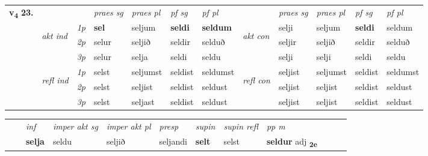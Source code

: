 \begin{tabular}{llllllllllll} \toprule
\multirow{4}{*}{{{\textbf{v{\textsubscript{4}}} \Large{\textbf{23.}}}}}  & &   &  \textit{praes sg}  & \textit{praes pl}  &\textit{ pf sg} & \textit{pf pl} &  &  \textit{praes sg}  & \textit{praes pl}  & \textit{pf sg} & \textit{pf pl } \\*
	\cmidrule{4-7} \cmidrule{9-12}
 & \multirow{3}{*}{\begin{turn}{90}\textit{akt ind}\end{turn}} & {\textit{1p}} & \textbf{sel} & seljum    & \textbf{seldi} & \textbf{seldum} & \multirow{3}{*}{\begin{turn}{90}\textit{akt con}\end{turn}} &selji & seljum & \textbf{seldi} & seldum\\*
& &  {\textit{2p}} &  selur  & seljið   & seldir & selduð & & seljir & seljið & seldir & selduð \\*
& &  {\textit{3p}} & selur & selja   & seldi & seldu & & selji & selji& seldi & seldu  \\*
\cmidrule{4-7} \cmidrule{9-12}
 &\multirow{3}{*}{\begin{turn}{90}\textit{refl ind}\end{turn}} & {\textit{1p}} & selst & seljumst    & seldist & seldumst & \multirow{3}{*}{\begin{turn}{90}\textit{refl con}\end{turn}}  &seljist & seljumst & seldist & seldumst\\*
 &&  {\textit{2p}} &  selst  & seljist   & seldist & seldust & &seljist & seljist & seldist & seldust \\*
& &  {\textit{3p}} & selst & seljast   & seldist & seldust & & seljist & seljist& seldist & seldust  \\*
\cmidrule{4-7} \cmidrule{9-12}
\end{tabular}


\begin{tabular}{llllllllllll}
 & & \textit{inf} & \textit{imper akt sg} & \textit{imper akt pl}   & \textit{presp} & \textit{supin} & \textit{supin refl} & \textit{pp m}     \\*
  & & \textbf{selja} & seldu  & seljið   & seljandi &  \textbf{selt} & selst & \textbf{seldur} adj \textbf{\textsubscript{2e}} \\*
\cmidrule{1-12}
\end{tabular}



